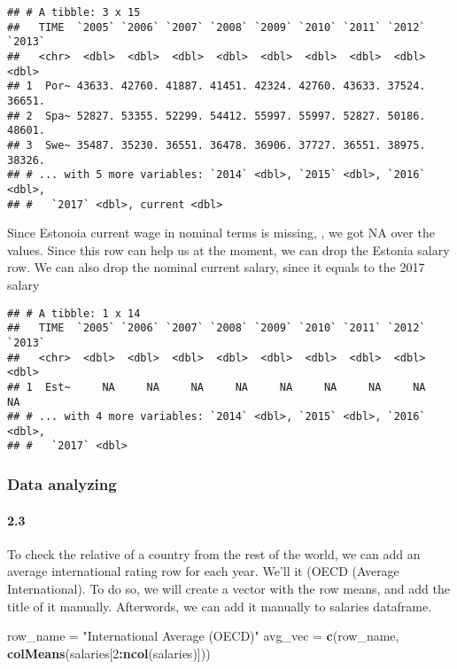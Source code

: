 \documentclass[]{article}
\newenvironment{Shaded}{\begin{snugshade}}{\end{snugshade}}
\newcommand{\KeywordTok}[1]{\textcolor[rgb]{0.13,0.29,0.53}{\textbf{#1}}}
\newcommand{\DecValTok}[1]{\textcolor[rgb]{0.00,0.00,0.81}{#1}}
\newcommand{\StringTok}[1]{\textcolor[rgb]{0.31,0.60,0.02}{#1}}
\newcommand{\OperatorTok}[1]{\textcolor[rgb]{0.81,0.36,0.00}{\textbf{#1}}}
\newcommand{\NormalTok}[1]{#1}
\let\oldparagraph\paragraph
\renewcommand{\paragraph}[1]{\oldparagraph{#1}\mbox{}}
\begin{document}
\begin{verbatim}
## # A tibble: 3 x 15
##   TIME  `2005` `2006` `2007` `2008` `2009` `2010` `2011` `2012` `2013`
##   <chr>  <dbl>  <dbl>  <dbl>  <dbl>  <dbl>  <dbl>  <dbl>  <dbl>  <dbl>
## 1  Por~ 43633. 42760. 41887. 41451. 42324. 42760. 43633. 37524. 36651.
## 2  Spa~ 52827. 53355. 52299. 54412. 55997. 55997. 52827. 50186. 48601.
## 3  Swe~ 35487. 35230. 36551. 36478. 36906. 37727. 36551. 38975. 38326.
## # ... with 5 more variables: `2014` <dbl>, `2015` <dbl>, `2016` <dbl>,
## #   `2017` <dbl>, current <dbl>
\end{verbatim}

Since Estonoia current wage in nominal terms is missing, , we got NA
over the values. Since this row can help us at the moment, we can drop
the Estonia salary row. We can also drop the nominal current salary,
since it equals to the 2017 salary

\begin{verbatim}
## # A tibble: 1 x 14
##   TIME  `2005` `2006` `2007` `2008` `2009` `2010` `2011` `2012` `2013`
##   <chr>  <dbl>  <dbl>  <dbl>  <dbl>  <dbl>  <dbl>  <dbl>  <dbl>  <dbl>
## 1  Est~     NA     NA     NA     NA     NA     NA     NA     NA     NA
## # ... with 4 more variables: `2014` <dbl>, `2015` <dbl>, `2016` <dbl>,
## #   `2017` <dbl>
\end{verbatim}

\subsubsection{Data analyzing}\label{data-analyzing}

\paragraph{2.3}\label{section-6}

To check the relative of a country from the rest of the world, we can
add an average international rating row for each year. We'll it (OECD
(Average International). To do so, we will create a vector with the row
means, and add the title of it manually. Afterwords, we can add it
manually to salaries dataframe.

\begin{Shaded}
\begin{Highlighting}[]
\NormalTok{row_name =}\StringTok{ "International Average (OECD)"}
\NormalTok{avg_vec =}\StringTok{ }\KeywordTok{c}\NormalTok{(row_name, }\KeywordTok{colMeans}\NormalTok{(salaries[}\DecValTok{2}\OperatorTok{:}\KeywordTok{ncol}\NormalTok{(salaries)]))}
\end{Highlighting}
\end{Shaded}
\end{document}
